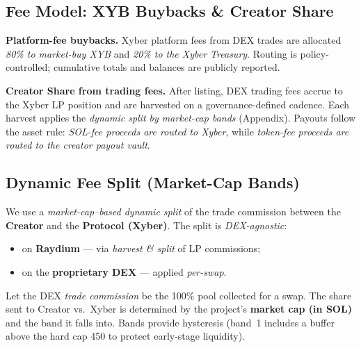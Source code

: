 \documentclass[10pt,twocolumn]{article}
\begin{document}
\subsection*{Fee Model: \textdollar XYB Buybacks \& Creator Share}
\textbf{Platform-fee buybacks.} Xyber platform fees from DEX trades are allocated \emph{80\% to market-buy \textdollar XYB} and \emph{20\% to the Xyber Treasury}. Routing is policy-controlled; cumulative totals and balances are publicly reported.

\textbf{Creator Share from trading fees.} After listing, DEX trading fees accrue to the Xyber LP position and are harvested on a governance-defined cadence. Each harvest applies the \emph{dynamic split by market-cap bands} (Appendix). Payouts follow the asset rule: \emph{SOL-fee proceeds are routed to Xyber}, while \emph{token-fee proceeds are routed to the creator payout vault}.

\subsection*{Dynamic Fee Split (Market-Cap Bands)}
We use a \emph{market-cap–based dynamic split} of the trade commission between the \textbf{Creator} and the \textbf{Protocol (Xyber)}. The split is \emph{DEX-agnostic}:
\begin{itemize}
  \item on \textbf{Raydium} --- via \emph{harvest \& split} of LP commissions;
  \item on the \textbf{proprietary DEX} --- applied \emph{per-swap}.
\end{itemize}

Let the DEX \emph{trade commission} be the 100\% pool collected for a swap. The share sent to Creator vs.\ Xyber is determined by the project's \textbf{market cap (in SOL)} and the band it falls into. Bands provide hysteresis (band~1 includes a buffer above the hard cap 450 to protect early-stage liquidity).
\end{document}
